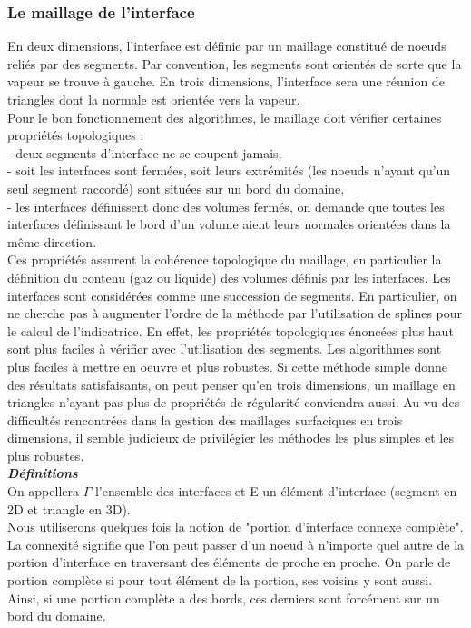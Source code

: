 \subsubsection{Le maillage de l'interface}
En deux dimensions, l'interface est d\'efinie par un maillage constitu\'e de noeuds reli\'es par des segments. Par convention, les segments sont orient\'es de sorte que la vapeur se trouve \`a gauche. En trois dimensions, l'interface sera une r\'eunion de triangles dont la normale est orient\'ee vers la vapeur.\\
Pour le bon fonctionnement des algorithmes, le maillage doit v\'erifier certaines propri\'et\'es topologiques :\\
- deux segments d'interface ne se coupent jamais,\\
- soit les interfaces sont ferm\'ees, soit leurs extr\'emit\'es (les noeuds n'ayant qu'un seul segment raccord\'e) sont situ\'ees sur un bord du domaine,\\
- les interfaces d\'efinissent donc des volumes ferm\'es, on demande que toutes les interfaces d\'efinissant le bord d'un volume aient leurs normales orient\'ees dans la m\^eme direction.\\
Ces propri\'et\'es assurent la coh\'erence topologique du maillage, en particulier la d\'efinition du contenu (gaz ou liquide) des volumes d\'efinis par les interfaces. Les interfaces sont consid\'er\'ees comme une succession de
segments. En particulier, on ne cherche pas \`a augmenter l'ordre de la m\'ethode par l'utilisation de splines pour le calcul de l'indicatrice. En effet, les propri\'et\'es topologiques \'enonc\'ees plus haut sont plus faciles \`a v\'erifier avec l'utilisation des segments. Les algorithmes sont plus faciles à mettre en oeuvre et plus robustes. Si cette m\'ethode simple donne des r\'esultats satisfaisants, on peut penser qu'en trois dimensions, un maillage en triangles n'ayant pas plus de propri\'et\'es de r\'egularit\'e conviendra aussi. Au vu des difficult\'es rencontr\'ees dans la gestion des maillages surfaciques en trois dimensions, il semble judicieux de privil\'egier les m\'ethodes les plus simples et les plus robustes.\smallskip \\

\textit{\textbf{D\'efinitions}}\smallskip \\

On appellera $\Gamma$ l'ensemble des interfaces et E un \'el\'ement d'interface (segment en 2D et triangle en 3D).\\
Nous utiliserons quelques fois la notion de "portion d'interface connexe complète". La connexit\'e signifie que l'on peut passer d'un noeud \`a n'importe quel autre de la portion d'interface en traversant des \'el\'ements de proche en proche. On parle de portion compl\`ete si pour tout \'el\'ement de la portion, ses voisins y sont aussi. Ainsi, si une portion compl\`ete a des bords, ces derniers sont forc\'ement sur un bord du domaine.

